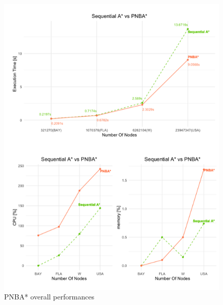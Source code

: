 \documentclass[twocolumn, switch]{article} %
\begin{document}
\begin{figure}[ht!]
  \centering
  \includegraphics[width=1\linewidth]{pnba/pnba.png}
  \caption{PNBA* overall performances}
  \label{pnbatot}
\end{figure}
\end{document}
